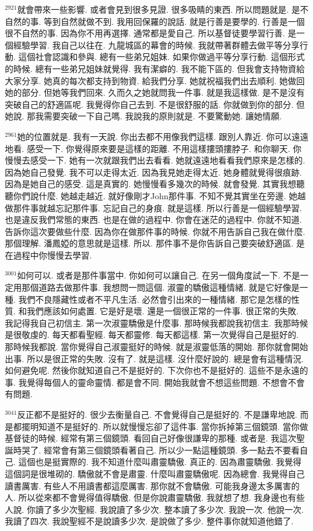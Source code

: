 \documentclass{book}
\begin{document}
$^{2921}$就會帶來一些影響.
或者會見到很多見證.
很多吸睛的東西.
所以問題就是.
是不自然的事.
等到自然就做不到.
我用回保羅的說話.
就是行善是要學的.
行善是一個很不自然的事.
因為你不用再選擇.
通常都是愛自己.
所以基督徒要學習行善.
是一個經驗學習.
我自己以往在.
九龍城區的幕會的時候.
我就帶著群體去做平等分享行動.
這個社會認識和參與.
總有一些弟兄姐妹.
如果你做過平等分享行動.
這個形式的時候.
總有一些弟兄姐妹就覺得.
我有潔癖的.
我不能下區的.
但我會支持物資給大家分享.
她真的每次都支持到物資.
給我們分享.
她就祝福我們出去順利.
她做回她的部分.
但她等我們回來.
久而久之她就問我一件事.
就是我這樣做.
是不是沒有突破自己的舒適區呢.
我覺得你自己去到.
不是很舒服的話.
你就做到你的部分.
但她說.
那我需要突破一下自己嗎.
我說我的原則就是.
不要驚動她.
讓她情願.

$^{2961}$她的位置就是.
我有一天說.
你出去都不用像我們這樣.
跟別人靠近.
你可以遠遠地看.
感受一下.
你覺得原來要是這樣的距離.
不用這樣摟頭摟脖子.
和你聊天.
你慢慢去感受一下.
她有一次就跟我們出去看看.
她就遠遠地看看我們原來是怎樣的.
因為她自己發覺.
我不可以走得太近.
因為我見她走得太近.
她身體就覺得很痕跡.
因為是她自己的感受.
這是真實的.
她慢慢看多幾次的時候.
就會發覺.
其實我想聽聽你們說什麼.
她越走越近.
就好像剛才John那件事.
不知不覺其實坐在旁邊.
她越做那件事就越忘記那件事.
忘記自己的身痕.
就是這樣.
所以行善是一個經驗學習.
也是違反我們常態的東西.
也是在做的過程中.
你會在迷茫的過程中.
你就不知道.
告訴你這次要做些什麼.
因為你在做那件事的時候.
你就不用告訴自己我在做什麼.
那個理解.
潘鳳婭的意思就是這樣.
所以.
那件事不是你告訴自己要突破舒適區.
是在過程中你慢慢去學習.

$^{3001}$如何可以.
或者是那件事當中.
你如何可以讓自己.
在另一個角度試一下.
不是一定用那個道路去做那件事.
我想問一問這個.
淑靈的驕傲這種情緒.
就是它好像是一種.
我們不良隱藏性或者不平凡生活.
必然會引出來的一種情緒.
那它是怎樣的性質.
和我們應該如何處置.
它是好是壞.
還是一個很正常的一件事.
很正常的失敗.
我記得我自己初信主.
第一次淑靈驕傲是什麼事.
那時候我都說我初信主.
我那時候是很敬虔的.
每天都看聖經.
每天都靈修.
每天都這樣.
第一次覺得自己是挺好的.
那時候我都說.
當你覺得自己淑靈挺好的時候.
就是淑靈低落的開始.
那你就會開始出事.
所以是很正常的失敗.
沒有了.
就是這樣.
沒什麼好說的.
總是會有這種情況.
如何避免呢.
然後你就知道自己不是挺好的.
下次你也不是挺好的.
這些不是永遠的事.
我覺得每個人的靈命靈情.
都是會不同.
開始我就會不想這些問題.
不想會不會有問題.

$^{3041}$反正都不是挺好的.
很少去衡量自己.
不會覺得自己是挺好的.
不是謙卑地說.
而是都擺明知道不是挺好的.
所以就慢慢忘卻了這件事.
當你拆掉第三個鏡頭.
當你做基督徒的時候.
經常有第三個鏡頭.
看回自己好像很謙卑的那種.
或者是.
我這次聖誕時哭了.
經常會有第三個鏡頭看著自己.
所以少一點這種鏡頭.
多一點去不要看自己.
這個也是挺實際的.
我不知道什麼叫肅靈驕傲.
真正的.
因為肅靈驕傲.
我覺得這個詞是很堆砌的.
驕傲就不會是肅靈.
什麼叫肅靈驕傲呢.
因為總會.
我覺得自己讀書厲害.
有些人不用讀書都這麼厲害.
那你就不會驕傲.
可能我身邊太多厲害的人.
所以從來都不會覺得值得驕傲.
但是你說肅靈驕傲.
我就想了想.
我身邊也有些人說.
你讀了多少次聖經.
我說讀了多少次.
整本讀了多少次.
我說一次.
他說一次.
我讀了四次.
我說聖經不是說讀多少次.
是說做了多少.
整件事你就知道他錯了.
\end{document}
